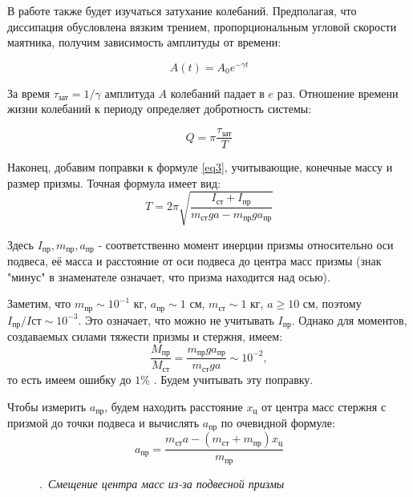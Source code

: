 \documentclass[a4paper,12pt]{article}
\begin{document}
\noindent
В работе также будет изучаться затухание колебаний. Предполагая, что диссипация обусловлена вязким трением, пропорциональным угловой скорости маятника, получим зависимость амплитуды от времени:

\begin{equation}
    A(t) = A_0 e^{-\gamma t}
\end{equation}

\noindent
За время $\tau_{\text{зат}} = 1/\gamma$ амплитуда $A$ колебаний падает в $e$ раз. Отношение времени жизни колебаний к периоду определяет добротность системы:

\begin{equation}\label{calc-Q}
Q = \pi \frac{\tau_{\text{зат}}}{T}
\end{equation}

Наконец, добавим поправки к формуле \eqref{eq3}, учитывающие, конечные массу и размер призмы. Точная формула имеет вид:
\begin{equation}
T = 2\pi \sqrt{\frac{I_{\text{ст}} + I_{\text{пр}}}{m_{\text{ст}} g a - m_{\text{пр}} g a_{\text{пр}}} }
\end{equation}

\noindent
Здесь $I_{\text{пр}}, m_{\text{пр}}, a_{\text{пр}}$ - соответственно момент инерции призмы относительно оси подвеса, её масса и расстояние от оси подвеса до центра масс призмы (знак "минус" в знаменателе означает, что призма находится над осью).

\noindent
Заметим, что $m_{\text{пр}} \sim 10^{-1} \text{ кг}$, $a_{\text{пр}} \sim 1 \text{ см}$, $m_{\text{ст}} \sim 1 \text{ кг} $, $a \geq 10 \text{ см}$, поэтому $I_{\text{пр}}/I{\text{ст}} \sim 10^{-3}$. Это означает, что можно не учитывать $I_{\text{пр}}$. Однако для моментов, создаваемых силами тяжести призмы и стержня, имеем:
\[\frac{M_{\text{пр}}}{M_{\text{ст}}} = \frac{m_{\text{пр}} g a_{\text{пр}}}{m_{\text{ст}} g a} \sim 10^{-2},\]
то есть имеем ошибку до $1\%$ . Будем учитывать эту поправку.

\noindent
Чтобы измерить $a_{\text{пр}}$, будем находить расстояние $x_{\text{ц}}$ от центра масс стержня с призмой до точки подвеса и вычислять $a_{\text{пр}}$ по очевидной формуле: 
\begin{equation}
a_{\text{пр}} = \frac{m_{\text{ст}} a - (m_{\text{ст}} + m_{\text{пр}})x_{\text{ц}}}{m_{\text{пр}}}
\end{equation}

\begin{figure}[h!]
    \caption{.\ \textit{Смещение центра масс из-за подвесной призмы}}
\end{figure}
\end{document}
